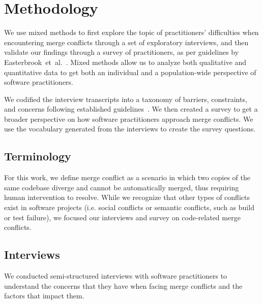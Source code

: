 \section{Methodology}\label{methodology}

We use mixed methods to first explore the topic of practitioners' difficulties when encountering merge conflicts through a set of exploratory interviews, and then validate our findings through a survey of practitioners, as per guidelines by \mbox{Easterbrook et al.}~\cite{easterbrook2008selecting}.
Mixed methods allow us to analyze both qualitative and quantitative data to get both an individual and a population-wide perspective of software practitioners.

We codified the interview transcripts into a taxonomy of barriers, constraints, and concerns following established guidelines~\cite{latoza2006maintaining, shull2008guide, tao2012software}. We then created a survey to get a broader perspective on how software practitioners approach merge conflicts. We use the vocabulary generated from the interviews to create the survey questions.

\subsection{Terminology}\label{terminology_methods}
For this work, we define merge conflict as a scenario in which two copies of the same codebase diverge and cannot be automatically merged, thus requiring human intervention to resolve. 
While we recognize that other types of conflicts exist in software projects (i.e. social conflicts or semantic conflicts, such as build or test failure), we focused our interviews and survey on code-related merge conflicts.

\subsection{Interviews}\label{interview_methods}

We conducted semi-structured interviews with software practitioners to understand the concerns that they have when facing merge conflicts and the factors that impact them.

